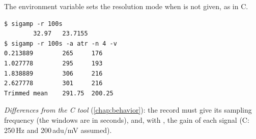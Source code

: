 The environment variable  sets the resolution mode when  is not
given, as in C.
\begin{lstlisting}[style=text]
$ sigamp -r 100s
        32.97   23.7155
$ sigamp -r 100s -a atr -n 4 -v
0.213889        265     176
1.027778        295     193
1.838889        306     216
2.627778        301     216
Trimmed mean    291.75  200.25
\end{lstlisting}
\textit{Differences from the C tool} (\cref{chap:behavior}): the record must give its
sampling frequency (the windows are in seconds), and, with , the gain of each signal
(C: 250\,Hz and 200\,adu/mV assumed).

